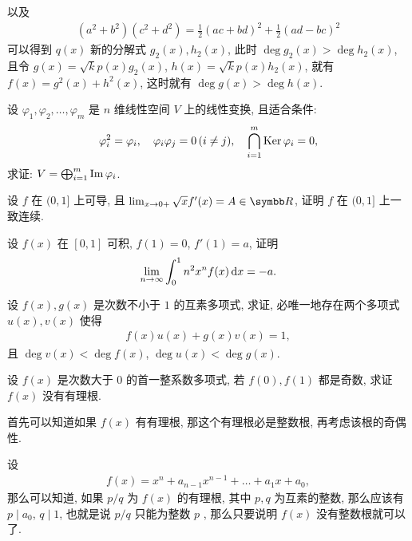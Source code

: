 \begin{exercise}[series=exer]
\begin{answer}
\begin{answersheet}
          以及
          \begin{align*}
              (a^{2} + b^{2})(c^{2} + d^{2}) = \frac{1}{2}(ac + bd)^{2} + \frac{1}{2}(ad - bc)^{2}
          \end{align*}
          可以得到 $ q(x) $ 新的分解式 $ g_{2}(x), h_{2}(x) $, 此时 $ \deg g_{2}(x) > \deg h_{2}(x) $, 且令 $ g(x) = \sqrt{k}p(x)g_{2}(x) $, $ h(x) = \sqrt{k}p(x)h_{2}(x) $, 就有 $ f(x) = g^{2}(x) + h^{2}(x) $, 这时就有 $ \deg g(x) > \deg h(x) $.
      \end{answersheet}
  \end{answer}
  \item 设 $ \varphi_{1}, \varphi_{2}, \dots, \varphi_{m} $ 是 $ n $ 维线性空间 $ V $ 上的线性变换, 且适合条件:
  \begin{align*}
      \varphi_{i}^{2} = \varphi_{i}, \quad \varphi_{i}\varphi_{j} = 0\,(i\ne j), \quad \bigcap_{i=1}^{m}\operatorname{Ker}\varphi_{i} = 0,
  \end{align*}
  求证: $ V = \bigoplus_{i=1}^{m}\operatorname{Im}\varphi_{i} $.
  \item 设 $ f $ 在 $ (0, 1] $ 上可导, 且 $ \limit{x}{0+} \sqrt{x} f'(x) = A \in \R $, 证明 $ f $ 在 $ (0, 1] $ 上一致连续.
  \item 设 $ f(x) $ 在 $ [0, 1] $ 可积, $ f(1) = 0 $, $ f'(1) = a $, 证明
  \begin{align*}
      \limit{n}{\infty}\int_{0}^{1}n^{2}x^{n}f(x)\dx* = -a.
  \end{align*}
  \item 设 $ f(x), g(x) $ 是次数不小于 $ 1 $ 的互素多项式, 求证, 必唯一地存在两个多项式 $ u(x), v(x) $ 使得
  \begin{align*}
      f(x)u(x) + g(x)v(x) = 1,
  \end{align*}
  且 $ \deg v(x) < \deg f(x) $, $ \deg u(x) < \deg g(x) $.
  \item 设 $ f(x) $ 是次数大于 $ 0 $ 的首一整系数多项式, 若 $ f(0), f(1) $ 都是奇数, 求证 $ f(x) $ 没有有理根.
  \begin{hint}
      首先可以知道如果 $ f(x) $ 有有理根, 那这个有理根必是整数根, 再考虑该根的奇偶性.
  \end{hint}
  \begin{answer}
      设
      \begin{align*}
          f(x) = x^{n} + a_{n - 1}x^{n - 1} + \dots + a_{1}x + a_{0},
      \end{align*}
      那么可以知道, 如果 $ p/q $ 为 $ f(x) $ 的有理根, 其中 $ p, q $ 为互素的整数, 那么应该有 $ p \mid a_{0} $, $ q \mid 1 $, 也就是说 $ p/q $ 只能为整数 $ p $ , 那么只要说明 $ f(x) $ 没有整数根就可以了.


\end{answer}
\end{exercise}
